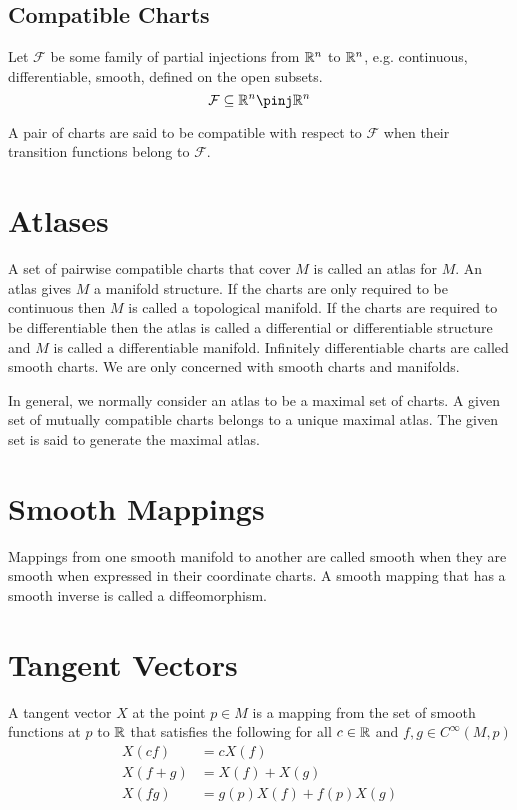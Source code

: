 \documentclass[11pt, oneside]{article}
\begin{document}
    \subsection{Compatible Charts}
    Let $\mathcal{F}$ be some family of partial injections from $\mathbb{R}^n$ to $\mathbb{R}^n$, e.g. continuous, differentiable, smooth, defined on the open subsets.
    \begin{equation}
        \mathcal{F} \subseteq \R^n \pinj \R^n
    \end{equation}

    A pair of charts are said to be compatible with respect to $\mathcal{F}$ when their transition functions belong to $\mathcal{F}$.

    \section{Atlases}
    A set of pairwise compatible charts that cover $M$ is called an atlas for $M$.
    An atlas gives $M$ a manifold structure.
    If the charts are only required to be continuous then $M$ is called a topological manifold.
    If the charts are required to be differentiable then the atlas is called a differential or differentiable structure and $M$ is called
    a differentiable manifold.
    Infinitely differentiable charts are called smooth charts.
    We are only concerned with smooth charts and manifolds.

    In general, we normally consider an atlas to be a maximal set of charts.
    A given set of mutually compatible charts belongs to a unique maximal atlas.
    The given set is said to generate the maximal atlas.

    \section{Smooth Mappings}
    Mappings from one smooth manifold to another are called smooth when they are smooth when expressed in their coordinate charts.
    A smooth mapping that has a smooth inverse is called a diffeomorphism.

    \section{Tangent Vectors}
    A tangent vector $X$ at the point $p \in M$ is a mapping from the set of smooth functions at $p$ to $\mathbb{R}$ that satisfies the following
    for all $c \in \mathbb{R}$ and $f,g \in C^{\infty}(M,p)$
    \begin{align}
        X(cf) &= cX(f) \\
        X(f + g) &= X(f) + X(g) \\
        X(fg) &= g(p)X(f) + f(p)X(g)
    \end{align}
\end{document}
